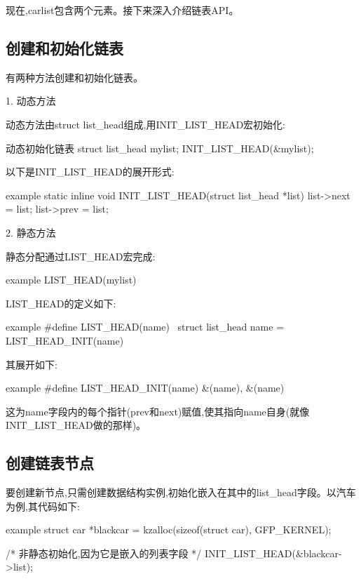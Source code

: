 \documentclass[lang=cn,newtx,10pt,scheme=chinese]{elegantbook}
\begin{document}
现在,carlist包含两个元素。接下来深入介绍链表API。

\subsection{创建和初始化链表}

有两种方法创建和初始化链表。

1. 动态方法

动态方法由struct list\_head组成,用INIT\_LIST\_HEAD宏初始化:

\begin{mycode}{动态初始化链表}
struct list_head mylist;
INIT_LIST_HEAD(&mylist);
\end{mycode}

以下是INIT\_LIST\_HEAD的展开形式:

\begin{mycode}{example}
static inline void INIT_LIST_HEAD(struct list_head *list)
{
    list->next = list;
    list->prev = list;
}
\end{mycode}

2. 静态方法

静态分配通过LIST\_HEAD宏完成:

\begin{mycode}{example}
LIST_HEAD(mylist)
\end{mycode}

LIST\_HEAD的定义如下:

\begin{mycode}{example}
#define LIST_HEAD(name) \
    struct list_head name = LIST_HEAD_INIT(name)
\end{mycode}

其展开如下:

\begin{mycode}{example}
#define LIST_HEAD_INIT(name) { &(name), &(name) }
\end{mycode}

这为name字段内的每个指针(prev和next)赋值,使其指向name自身(就像INIT\_LIST\_HEAD做的那样)。

\subsection{创建链表节点}

要创建新节点,只需创建数据结构实例,初始化嵌入在其中的list\_head字段。以汽车为例,其代码如下:

\begin{mycode}{example}
struct car *blackcar = kzalloc(sizeof(struct car), GFP_KERNEL);

/* 非静态初始化,因为它是嵌入的列表字段 */
INIT_LIST_HEAD(&blackcar->list);
\end{mycode}
\end{document}
